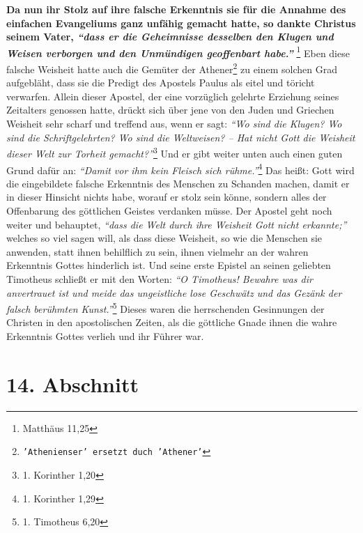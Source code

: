 \label{ref:07_13_gelehrte}
\textbf{Da nun ihr Stolz auf ihre falsche Erkenntnis
sie für die Annahme des einfachen
Evangeliums ganz unfähig gemacht hatte, so dankte Christus seinem Vater,
\textit{"`dass er die Geheimnisse desselben den Klugen und Weisen verborgen und
den Unmündigen geoffenbart habe."'}}
\footnote{Matthäus 11,25}
Eben diese falsche Weisheit hatte
auch die Gemüter der
Athener\footnote{\texttt{'Athenienser' ersetzt duch
'Athener'}} zu einem solchen Grad
aufgebläht, dass sie
die Predigt des Apostels Paulus als eitel und töricht
verwarfen. Allein dieser
Apostel, der eine vorzüglich gelehrte Erziehung seines Zeitalters genossen
hatte, drückt sich über jene von den Juden und
Griechen
Weisheit sehr scharf und treffend aus, wenn er sagt:
\textit{"`Wo sind die Klugen? Wo
sind die Schriftgelehrten? Wo sind die Weltweisen? -- Hat nicht Gott die
Weisheit dieser Welt zur Torheit gemacht?"'}\footnote{1. Korinther 1,20}
Und er
gibt weiter unten auch einen guten Grund dafür an:
\textit{"`Damit vor ihm kein Fleisch sich rühme."'}\footnote{1. Korinther 1,29}
Das heißt: Gott wird die eingebildete
falsche Erkenntnis des Menschen zu Schanden machen, damit er in dieser Hinsicht
nichts habe, worauf er stolz sein könne, sondern alles der
Offenbarung des
göttlichen Geistes verdanken müsse. Der Apostel geht noch weiter und behauptet,
\textit{"`dass die Welt durch ihre Weisheit Gott nicht erkannte;"'}
welches so viel sagen
will, als dass diese Weisheit, so wie die Menschen sie anwenden, statt ihnen
behilflich zu sein, ihnen vielmehr an der wahren Erkenntnis Gottes hinderlich
ist. Und seine erste Epistel an seinen geliebten Timotheus schließt er mit den
Worten:
\textit{"`O Timotheus! Bewahre was dir anvertrauet ist und meide das
ungeistliche lose Geschwätz und das Gezänk der falsch berühmten
Kunst."'}\footnote{1. Timotheus 6,20}
Dieses waren die herrschenden Gesinnungen der
Christen in den apostolischen Zeiten, als die göttliche Gnade ihnen die wahre
Erkenntnis Gottes verlieh und ihr Führer war.

\section{14. Abschnitt} \label{kap7_ab14}

